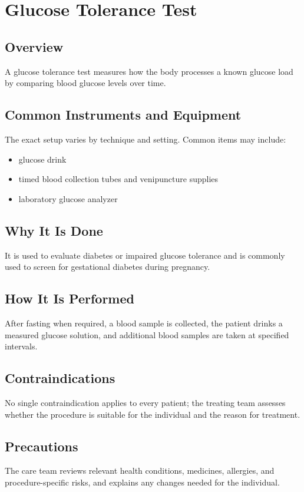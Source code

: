 \chapter{Glucose Tolerance Test}

\section*{Overview}
A glucose tolerance test measures how the body processes a known glucose load by comparing blood glucose levels over time.

\section*{Common Instruments and Equipment}
The exact setup varies by technique and setting. Common items may include:
\begin{itemize}[nosep,leftmargin=*]
  \item glucose drink
  \item timed blood collection tubes and venipuncture supplies
  \item laboratory glucose analyzer
\end{itemize}

\section*{Why It Is Done}
It is used to evaluate diabetes or impaired glucose tolerance and is commonly used to screen for gestational diabetes during pregnancy.

\section*{How It Is Performed}
After fasting when required, a blood sample is collected, the patient drinks a measured glucose solution, and additional blood samples are taken at specified intervals.

\section*{Contraindications}
No single contraindication applies to every patient; the treating team assesses whether the procedure is suitable for the individual and the reason for treatment.

\section*{Precautions}
The care team reviews relevant health conditions, medicines, allergies, and procedure-specific risks, and explains any changes needed for the individual.

